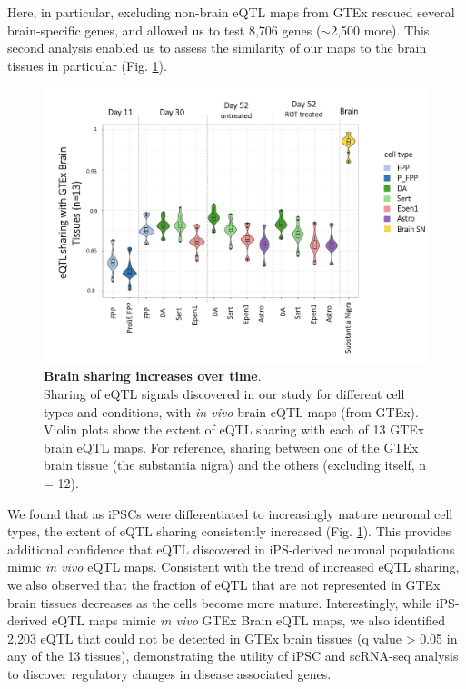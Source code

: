 Here, in particular, excluding non-brain eQTL maps from GTEx rescued several brain-specific genes, and allowed us to test 8,706 genes ($\sim$2,500 more).
This second analysis enabled us to assess the similarity of our maps to the brain tissues in particular (Fig. \ref{fig:neuroseq_and_gtex_brain_sharing}). \\

\begin{figure}[h]
\centering
\includegraphics[width=16cm]{Chapter5/Fig/neuroseq_gtex_brain_boxplots.png}
\caption[Brain sharing increase]{\textbf{Brain sharing increases over time}.\\
Sharing of eQTL signals discovered in our study for different cell types and conditions, 
with \textit{in vivo} brain eQTL maps (from GTEx). 
Violin plots show the extent of eQTL sharing with each of 13 GTEx brain eQTL maps.
For reference, sharing between one of the GTEx brain tissue (the substantia nigra) and the others (excluding itself, n = 12).}
\label{fig:neuroseq_and_gtex_brain_sharing}
\end{figure}

We found that as iPSCs were differentiated to increasingly mature neuronal cell types, the extent of eQTL sharing consistently increased (Fig. \ref{fig:neuroseq_and_gtex_brain_sharing}). 
This provides additional confidence that eQTL discovered in iPS-derived neuronal populations mimic \textit{in vivo} eQTL maps. 
Consistent with the trend of increased eQTL sharing, we also observed that the fraction of eQTL that are not represented in GTEx brain tissues decreases as the cells become more mature. 
Interestingly, while iPS-derived eQTL maps mimic \textit{in vivo} GTEx Brain eQTL maps, we also identified 2,203 eQTL that could not be detected in GTEx brain tissues (q value > 0.05 in any of the 13 tissues), demonstrating the utility of iPSC and scRNA-seq analysis to discover regulatory changes in disease associated genes. \\

